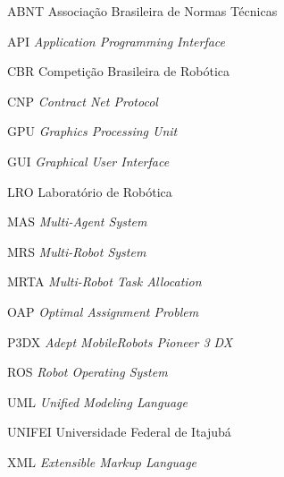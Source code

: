 \renewcommand{\nomname}{\listadesiglasname}
\pdfbookmark[0]{\nomname}{las}
\cleardoublepage
\begin{siglas}
    \item[ABNT] Associação Brasileira de Normas Técnicas
    \item[API] \textit{Application Programming Interface}
    \item[CBR] Competição Brasileira de Robótica
    \item[CNP] \textit{Contract Net Protocol}
    \item[GPU] \textit{Graphics Processing Unit}
    \item[GUI] \textit{Graphical User Interface}
    \item[LRO] Laboratório de Robótica
    \item[MAS] \textit{Multi-Agent System}
    \item[MRS] \textit{Multi-Robot System}
    \item[MRTA] \textit{Multi-Robot Task Allocation}
    \item[OAP] \textit{Optimal Assignment Problem}
    \item[P3DX] \textit{Adept MobileRobots Pioneer 3 DX}
    \item[ROS] \textit{Robot Operating System}
    \item[UML] \textit{Unified Modeling Language}
    \item[UNIFEI] Universidade Federal de Itajubá
    \item[XML] \textit{Extensible Markup Language}
\end{siglas}
